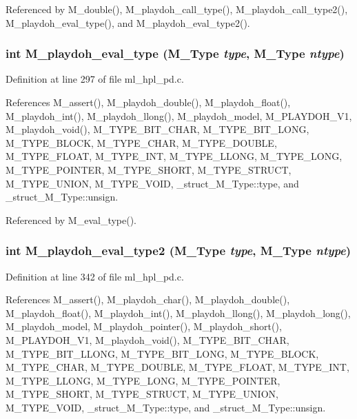 Referenced by M\_\-double(), M\_\-playdoh\_\-call\_\-type(), M\_\-playdoh\_\-call\_\-type2(), M\_\-playdoh\_\-eval\_\-type(), and M\_\-playdoh\_\-eval\_\-type2().
\subsubsection{\setlength{\rightskip}{0pt plus 5cm}int M\_\-playdoh\_\-eval\_\-type (\bf{M\_\-Type} {\em type}, \bf{M\_\-Type} {\em ntype})}\label{ml__hpl__pd_8c_21b90627827c6a1b572b992b985858ce}




Definition at line 297 of file ml\_\-hpl\_\-pd.c.

References M\_\-assert(), M\_\-playdoh\_\-double(), M\_\-playdoh\_\-float(), M\_\-playdoh\_\-int(), M\_\-playdoh\_\-llong(), M\_\-playdoh\_\-model, M\_\-PLAYDOH\_\-V1, M\_\-playdoh\_\-void(), M\_\-TYPE\_\-BIT\_\-CHAR, M\_\-TYPE\_\-BIT\_\-LONG, M\_\-TYPE\_\-BLOCK, M\_\-TYPE\_\-CHAR, M\_\-TYPE\_\-DOUBLE, M\_\-TYPE\_\-FLOAT, M\_\-TYPE\_\-INT, M\_\-TYPE\_\-LLONG, M\_\-TYPE\_\-LONG, M\_\-TYPE\_\-POINTER, M\_\-TYPE\_\-SHORT, M\_\-TYPE\_\-STRUCT, M\_\-TYPE\_\-UNION, M\_\-TYPE\_\-VOID, \_\-struct\_\-M\_\-Type::type, and \_\-struct\_\-M\_\-Type::unsign.

Referenced by M\_\-eval\_\-type().
\subsubsection{\setlength{\rightskip}{0pt plus 5cm}int M\_\-playdoh\_\-eval\_\-type2 (\bf{M\_\-Type} {\em type}, \bf{M\_\-Type} {\em ntype})}\label{ml__hpl__pd_8c_0be5fb86588f43be08fd1bc5a7584829}




Definition at line 342 of file ml\_\-hpl\_\-pd.c.

References M\_\-assert(), M\_\-playdoh\_\-char(), M\_\-playdoh\_\-double(), M\_\-playdoh\_\-float(), M\_\-playdoh\_\-int(), M\_\-playdoh\_\-llong(), M\_\-playdoh\_\-long(), M\_\-playdoh\_\-model, M\_\-playdoh\_\-pointer(), M\_\-playdoh\_\-short(), M\_\-PLAYDOH\_\-V1, M\_\-playdoh\_\-void(), M\_\-TYPE\_\-BIT\_\-CHAR, M\_\-TYPE\_\-BIT\_\-LLONG, M\_\-TYPE\_\-BIT\_\-LONG, M\_\-TYPE\_\-BLOCK, M\_\-TYPE\_\-CHAR, M\_\-TYPE\_\-DOUBLE, M\_\-TYPE\_\-FLOAT, M\_\-TYPE\_\-INT, M\_\-TYPE\_\-LLONG, M\_\-TYPE\_\-LONG, M\_\-TYPE\_\-POINTER, M\_\-TYPE\_\-SHORT, M\_\-TYPE\_\-STRUCT, M\_\-TYPE\_\-UNION, M\_\-TYPE\_\-VOID, \_\-struct\_\-M\_\-Type::type, and \_\-struct\_\-M\_\-Type::unsign.

